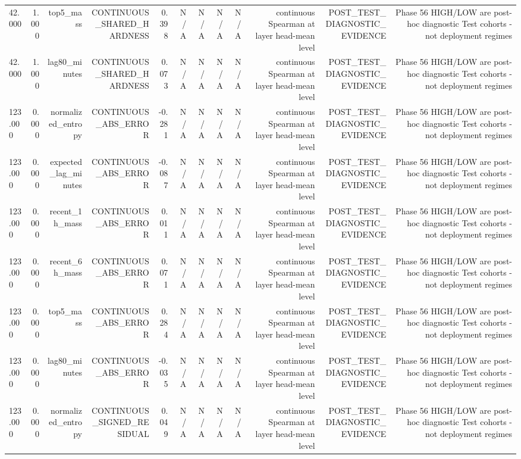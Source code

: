 \begin{table}[h!]
\begin{tabular}{lrrrrrrrrrrr}
42.000 & 1.000 & top5\_mass & CONTINUOUS\_SHARED\_HARDNESS & 0.398 & N/A & N/A & N/A & N/A & continuous Spearman at layer head-mean level & POST\_TEST\_DIAGNOSTIC\_EVIDENCE & Phase 56 HIGH/LOW are post-hoc diagnostic Test cohorts - not deployment regimes \\
42.000 & 1.000 & lag80\_minutes & CONTINUOUS\_SHARED\_HARDNESS & 0.073 & N/A & N/A & N/A & N/A & continuous Spearman at layer head-mean level & POST\_TEST\_DIAGNOSTIC\_EVIDENCE & Phase 56 HIGH/LOW are post-hoc diagnostic Test cohorts - not deployment regimes \\
123.000 & 0.000 & normalized\_entropy & CONTINUOUS\_ABS\_ERROR & -0.281 & N/A & N/A & N/A & N/A & continuous Spearman at layer head-mean level & POST\_TEST\_DIAGNOSTIC\_EVIDENCE & Phase 56 HIGH/LOW are post-hoc diagnostic Test cohorts - not deployment regimes \\
123.000 & 0.000 & expected\_lag\_minutes & CONTINUOUS\_ABS\_ERROR & -0.087 & N/A & N/A & N/A & N/A & continuous Spearman at layer head-mean level & POST\_TEST\_DIAGNOSTIC\_EVIDENCE & Phase 56 HIGH/LOW are post-hoc diagnostic Test cohorts - not deployment regimes \\
123.000 & 0.000 & recent\_1h\_mass & CONTINUOUS\_ABS\_ERROR & 0.011 & N/A & N/A & N/A & N/A & continuous Spearman at layer head-mean level & POST\_TEST\_DIAGNOSTIC\_EVIDENCE & Phase 56 HIGH/LOW are post-hoc diagnostic Test cohorts - not deployment regimes \\
123.000 & 0.000 & recent\_6h\_mass & CONTINUOUS\_ABS\_ERROR & 0.071 & N/A & N/A & N/A & N/A & continuous Spearman at layer head-mean level & POST\_TEST\_DIAGNOSTIC\_EVIDENCE & Phase 56 HIGH/LOW are post-hoc diagnostic Test cohorts - not deployment regimes \\
123.000 & 0.000 & top5\_mass & CONTINUOUS\_ABS\_ERROR & 0.284 & N/A & N/A & N/A & N/A & continuous Spearman at layer head-mean level & POST\_TEST\_DIAGNOSTIC\_EVIDENCE & Phase 56 HIGH/LOW are post-hoc diagnostic Test cohorts - not deployment regimes \\
123.000 & 0.000 & lag80\_minutes & CONTINUOUS\_ABS\_ERROR & -0.035 & N/A & N/A & N/A & N/A & continuous Spearman at layer head-mean level & POST\_TEST\_DIAGNOSTIC\_EVIDENCE & Phase 56 HIGH/LOW are post-hoc diagnostic Test cohorts - not deployment regimes \\
123.000 & 0.000 & normalized\_entropy & CONTINUOUS\_SIGNED\_RESIDUAL & 0.049 & N/A & N/A & N/A & N/A & continuous Spearman at layer head-mean level & POST\_TEST\_DIAGNOSTIC\_EVIDENCE & Phase 56 HIGH/LOW are post-hoc diagnostic Test cohorts - not deployment regimes \\

\end{tabular}
\end{table}
